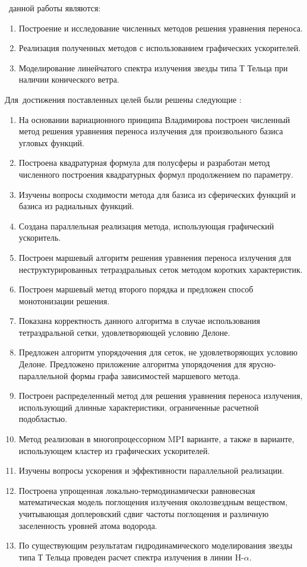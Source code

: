  \aim\ данной работы являются:
\begin{enumerate}
  \item Построение и исследование численных методов решения уравнения переноса.
  \item Реализация полученных методов с использованием графических ускорителей.
  \item Моделирование линейчатого спектра излучения звезды типа Т Тельца при наличии конического ветра. 
\end{enumerate}

Для~достижения поставленных целей были решены следующие {\tasks}:
\begin{enumerate}
  \item На основании вариационного принципа Владимирова построен численный метод решения уравнения переноса излучения для произвольного базиса угловых функций.
  \item Построена квадратурная формула для полусферы и разработан метод численного построения квадратурных формул продолжением по параметру.
  \item Изучены вопросы сходимости метода для базиса из сферических функций и базиса из радиальных функций.
  \item Создана параллельная реализация метода, использующая графический ускоритель.
  
  \item Построен маршевый алгоритм решения уравнения переноса излучения для неструктурированных тетраэдральных сеток методом коротких характеристик.
  \item Построен маршевый метод второго порядка и предложен способ монотонизации решения.
  \item Показана корректность данного алгоритма в случае использования тетраэдральной сетки, удовлетворяющей условию Делоне.
  \item Предложен алгоритм упорядочения для сеток, не удовлетворяющих условию Делоне. Предложено приложение алгоритма упорядочения для ярусно-параллельной формы графа зависимостей маршевого метода.
  
  \item Построен распределенный метод для решения уравнения переноса излучения, использующий длинные характеристики, ограниченные расчетной подобластью.
  \item Метод реализован в многопроцессорном MPI варианте, а также в варианте, использующем кластер из графических ускорителей.
  \item Изучены вопросы ускорения и эффективности параллельной реализации.
  
  \item Построена упрощенная локально-термодинамически равновесная математическая модель поглощения излучения околозвездным веществом, учитывающая доплеровский сдвиг частоты поглощения и различную заселенность уровней атома водорода.
  \item По существующим результатам гидродинамического моделирования звезды типа Т Тельца проведен расчет спектра излучения в линии $\text{H-}\alpha$.
\end{enumerate}

